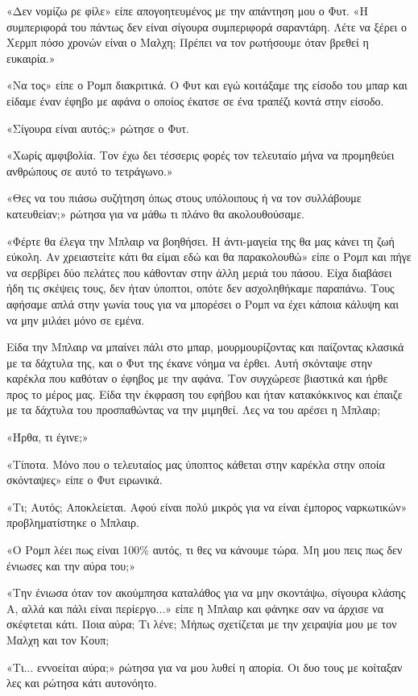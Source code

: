 \documentclass[12pt,twoside, openany]{book}
\begin{document}
«Δεν νομίζω ρε φίλε» είπε απογοητευμένος με την απάντηση μου ο Φυτ. «Η συμπεριφορά του πάντως δεν είναι σίγουρα συμπεριφορά σαραντάρη. Λέτε να ξέρει ο Χερμπ πόσο χρονών είναι ο Μαλχη; Πρέπει να τον ρωτήσουμε όταν βρεθεί η ευκαιρία.»

«Να τος» είπε ο Ρομπ διακριτικά. Ο Φυτ και εγώ κοιτάξαμε της είσοδο του μπαρ και είδαμε έναν έφηβο με αφάνα ο οποίος έκατσε σε ένα τραπέζι κοντά στην είσοδο.

«Σίγουρα είναι αυτός;» ρώτησε ο Φυτ.

«Χωρίς αμφιβολία. Τον έχω δει τέσσερις φορές τον τελευταίο μήνα να προμηθεύει ανθρώπους σε αυτό το τετράγωνο.»

«Θες να του πιάσω συζήτηση όπως στους υπόλοιπους ή να τον συλλάβουμε κατευθείαν;» ρώτησα για να μάθω τι πλάνο θα ακολουθούσαμε.

«Φέρτε θα έλεγα την Μπλαιρ να βοηθήσει. Η άντι-μαγεία της θα μας κάνει τη ζωή εύκολη. Αν χρειαστείτε κάτι θα είμαι εδώ και θα παρακολουθώ» είπε ο Ρομπ και πήγε να σερβίρει δύο πελάτες που κάθονταν στην άλλη μεριά του πάσου. Είχα διαβάσει ήδη τις σκέψεις τους, δεν ήταν ύποπτοι, οπότε δεν ασχοληθήκαμε παραπάνω. Τους αφήσαμε απλά στην γωνία τους για να μπορέσει ο Ρομπ να έχει κάποια κάλυψη και να μην μιλάει μόνο σε εμένα.

Είδα την Μπλαιρ να μπαίνει πάλι στο μπαρ, μουρμουρίζοντας και παίζοντας κλασικά με τα δάχτυλα της, και ο Φυτ της έκανε νόημα να έρθει. Αυτή σκόνταψε στην καρέκλα που καθόταν ο έφηβος με την αφάνα. Τον συγχώρεσε βιαστικά και ήρθε προς το μέρος μας. Είδα την έκφραση του εφήβου και ήταν κατακόκκινος και έπαιζε με τα δάχτυλα του προσπαθώντας να την μιμηθεί. Λες να του αρέσει η Μπλαιρ;

«Ήρθα, τι έγινε;»

«Τίποτα. Μόνο που ο τελευταίος μας ύποπτος κάθεται στην καρέκλα στην οποία σκόνταψες» είπε ο Φυτ ειρωνικά.

«Τι; Αυτός; Αποκλείεται. Αφού είναι πολύ μικρός για να είναι έμπορος ναρκωτικών» προβληματίστηκε ο Μπλαιρ.

«Ο Ρομπ λέει πως είναι 100\% αυτός, τι θες να κάνουμε τώρα. Μη μου πεις πως δεν ένιωσες και την αύρα του;»

«Την ένιωσα όταν τον ακούμπησα καταλάθος για να μην σκοντάψω, σίγουρα κλάσης Α, αλλά και πάλι είναι περίεργο...» είπε η Μπλαιρ και φάνηκε σαν να άρχισε να σκέφτεται κάτι. Ποια αύρα; Τι λένε; Μήπως σχετίζεται με την χειραψία μου με τον Μαλχη και τον Κουπ;

«Τι... εννοείται αύρα;» ρώτησα για να μου λυθεί η απορία. Οι δυο τους με κοίταξαν λες και ρώτησα κάτι αυτονόητο.
\end{document}
